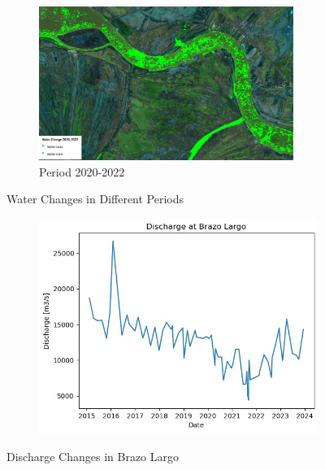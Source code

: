 \begin{figure}[H]
    \centering
    \begin{subfigure}[c]{0.6\textwidth}
        \includegraphics[width=\linewidth, height=5cm]{figures/ch5/2020-2022.jpg}
        \caption{Period 2020-2022}
        \label{fig:Period 2020-2022}
    \end{subfigure}
    
    \caption{Water Changes in Different Periods}
    \label{fig:Water Changes}
\end{figure}

\begin{figure}[H]
    \centering
    \begin{subfigure}{0.48\textwidth}
        \includegraphics[width=\linewidth]{figures/ch5/dischargepeak.jpg}
    \end{subfigure}
    
    \caption{Discharge Changes in Brazo Largo}
    \label{fig:Discharge Changes in Brazo Largo}
\end{figure}




